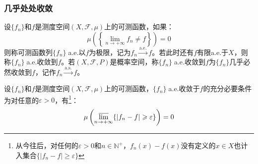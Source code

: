 \subsubsection{几乎处处收敛}
\begin{definition}
	设$\{f_n\}$和$f$是测度空间$(X,\mathscr{F},\mu)$上的可测函数，如果：
	\begin{equation*}
		\mu\left(\left\{\lim_{n\to+\infty}f_n\ne f\right\}\right)=0
	\end{equation*}
	则称可测函数列$\{f_n\}\;$a.e.以$f$为极限，记为$f_n\overset{\text{a.e.}}{\longrightarrow}f$。若此时还有$f$有限a.e.于$X$，则称$\{f_n\}\;$a.e.收敛到$f$。若$(X,\mathscr{F},P)$是概率空间，称$\{f_n\}\;$a.e.收敛到$f$为$\{f_n\}$几乎必然收敛到$f$，记作$f_n\overset{\text{a.s.}}{\longrightarrow}f$。
\end{definition}
\begin{theorem}\label{theo:EquiConditiona.e.}
	设$\{f_n\}$和$f$是测度空间$(X,\mathscr{F},\mu)$上的可测函数，$\{f_n\}\;$a.e.收敛于$f$的充分必要条件为对任意的$\varepsilon>0$，有\footnote{从今往后，对任何的$\varepsilon>0$和$n\in\mathbb{N}^+$，$f_n(x)-f(x)$没有定义的$x\in X$也计入集合$\{|f_n-f|\geqslant\varepsilon\}$}：
	\begin{equation*}
		\mu\left(\varlimsup_{n\to+\infty}\{|f_n-f|\geqslant\varepsilon\}\right)=0
	\end{equation*}
\end{theorem}
